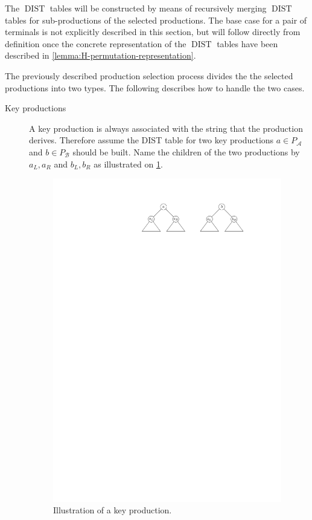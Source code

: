 \documentclass[twoside,11pt,openright]{report}
\newcommand{\DIST}{\operatorname{DIST}}
\begin{document}
The $\DIST$ tables will be constructed by means of recursively merging $\DIST$ tables for sub-productions of the selected productions. The base case for a pair of terminals is not explicitly described in this section, but will follow directly from definition once the concrete representation of the $\DIST$ tables have been described in \cref{lemma:H-permutation-representation}.

The previously described production selection process divides the the selected productions into two types. The following describes how to handle the two cases.
\begin{description}
  \item[Key productions] A key production is always associated with the string that the production derives. Therefore assume the DIST table for two key productions $a \in P_{\mathcal{A}}$ and $b \in P_{\mathcal{B}}$ should be built. Name the children of the two productions by $a_L, a_R$ and $b_L, b_R$ as illustrated on \cref{fig:distrepo-key}.
  
  \begin{figure}[h!]
    \centering
    \includegraphics[width=10cm]{images/distrepo-key}
    \caption{Illustration of a key production.}
    \label{fig:distrepo-key}
  \end{figure}
  

\end{description}
\end{document}
